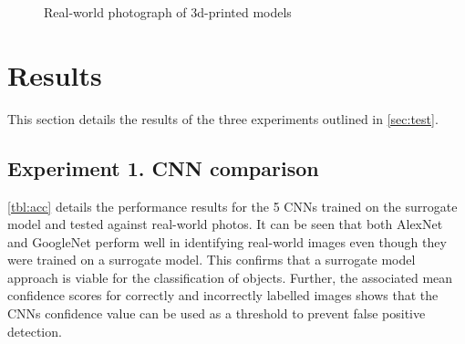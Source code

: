 \documentclass[a4paper, 11pt]{article}
\begin{document}
\begin{figure}[t!]
    \centering
    \hfill 
    \hfill 
    \caption{Real-world photograph of 3d-printed models}\label{fig:real-world}
\end{figure}


\section{Results}\label{sec:res}

This section details the results of the three experiments outlined in \cref{sec:test}.

\subsection{Experiment 1. CNN comparison}

\cref{tbl:acc} details the performance results for the 5 CNNs trained on the surrogate model and tested against real-world photos. It can be seen that both AlexNet and GoogleNet perform well in identifying real-world images even though they were trained on a surrogate model. This confirms that a surrogate model approach is viable for the classification of objects. Further, the associated mean confidence scores for correctly and incorrectly labelled images shows that the CNNs confidence value can be used as a threshold to prevent false positive detection.
\end{document}
